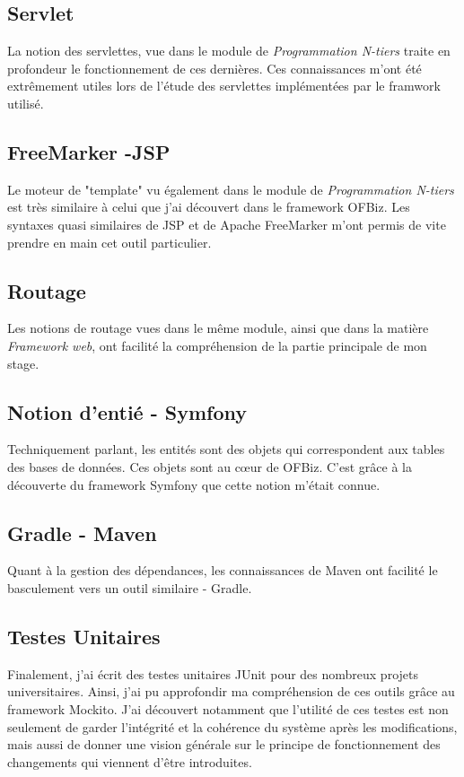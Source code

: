 \subsection{Servlet}
La notion des servlettes, vue dans le module de \emph{Programmation N-tiers} traite en profondeur le fonctionnement de ces dernières. Ces connaissances m'ont été extrêmement utiles lors de l'étude des servlettes implémentées par le framwork utilisé.   
\subsection{FreeMarker -JSP}
Le moteur de "template" vu également dans le module de \emph{Programmation N-tiers} est très similaire à celui que j'ai découvert dans le framework OFBiz. Les syntaxes quasi similaires de JSP et de Apache FreeMarker m'ont permis de vite prendre en main cet outil particulier. 
\subsection{Routage}
Les notions de routage vues dans le même module, ainsi que dans la matière \emph{Framework web}, ont facilité la compréhension de la partie principale de mon stage. 
\subsection{Notion d'entié - Symfony}
Techniquement parlant, les entités sont des objets qui correspondent aux tables des bases de données. Ces objets sont au cœur de OFBiz. C'est grâce à la découverte du framework Symfony que cette notion m'était connue. 
\subsection{Gradle - Maven}
Quant à la gestion des dépendances, les connaissances de Maven ont facilité le basculement vers un outil similaire - Gradle. 
\subsection{Testes Unitaires}
Finalement, j'ai écrit des testes unitaires JUnit pour des nombreux projets universitaires. Ainsi, j'ai pu approfondir ma compréhension de ces outils grâce au framework Mockito. J'ai découvert notamment que l'utilité de ces testes est non seulement de garder l'intégrité et la cohérence du système après les modifications, mais aussi de donner une vision générale sur le principe de fonctionnement des changements qui viennent d'être introduites. 
